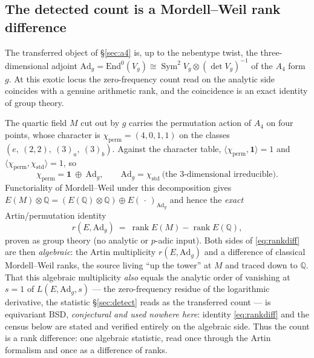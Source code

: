 \documentclass[11pt]{article}
\theoremstyle{definition}
\newcommand{\Sym}{\operatorname{Sym}}
\begin{document}
\subsection{The detected count is a Mordell--Weil rank difference}\label{sec:rankdiff}

The transferred object of \S\ref{sec:a4} is, up to the nebentype twist, the three-dimensional
adjoint $\mathrm{Ad}_g=\mathrm{End}^0(V_g)\cong\Sym^2 V_g\otimes(\det V_g)^{-1}$ of the $A_4$ form
$g$. At this exotic locus the zero-frequency count read on the analytic side coincides with a
genuine arithmetic rank, and the coincidence is an exact identity of group theory.

The quartic field $M$ cut out by $g$ carries the permutation action of $A_4$ on four points, whose
character is $\chi_{\mathrm{perm}}=(4,0,1,1)$ on the classes $(e,\ (2,2),\ (3)_a,\ (3)_b)$. Against the
character table, $\langle\chi_{\mathrm{perm}},\mathbf 1\rangle=1$ and
$\langle\chi_{\mathrm{perm}},\chi_{\mathrm{std}}\rangle=1$, so
\[
  \chi_{\mathrm{perm}}=\mathbf 1\ \oplus\ \mathrm{Ad}_g,\qquad \mathrm{Ad}_g=\chi_{\mathrm{std}}\
  \text{(the $3$-dimensional irreducible)} .
\]
Functoriality of Mordell--Weil under this decomposition gives
$E(M)\otimes\mathbb Q = (E(\mathbb Q)\otimes\mathbb Q)\oplus E(\,\cdot\,)_{\mathrm{Ad}_g}$ and hence the
\emph{exact} Artin/permutation identity
\begin{equation}\label{eq:rankdiff}
  r(E,\mathrm{Ad}_g)\ =\ \operatorname{rank}E(M)-\operatorname{rank}E(\mathbb Q),
\end{equation}
proven as group theory (no analytic or $p$-adic input). Both sides of \eqref{eq:rankdiff} are then
\emph{algebraic}: the Artin multiplicity $r(E,\mathrm{Ad}_g)$ and a difference of classical Mordell--Weil ranks,
the source living ``up the tower'' at $M$ and traced down to $\mathbb Q$. That this algebraic multiplicity
\emph{also} equals the analytic order of vanishing at $s=1$ of $L(E,\mathrm{Ad}_g,s)$ --- the zero-frequency
residue of the logarithmic derivative, the statistic \S\ref{sec:detect} reads as the transferred count --- is
equivariant BSD, \emph{conjectural and used nowhere here}: identity \eqref{eq:rankdiff} and the census below are
stated and verified entirely on the algebraic side. Thus the count is a rank difference: one algebraic statistic,
read once through the Artin formalism and once as a difference of ranks.
\end{document}
